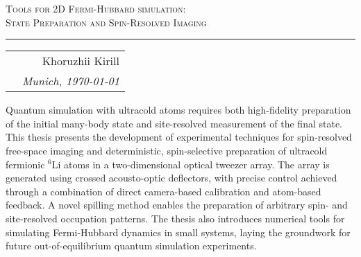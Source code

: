 

\begin{center}
    \LARGE \textsc{Tools for 2D Fermi-Hubbard simulation: \\ State Preparation and Spin-Resolved Imaging}
\end{center}

\hrule

\phantom{42}

\begin{flushright}
    \begin{tabular}{rr}
        & Khoruzhii Kirill \\
        & \textit{Munich, \today}\\
    \end{tabular}
\end{flushright}

\noindent
Quantum simulation with ultracold atoms requires both high-fidelity preparation of the initial many-body state and site-resolved measurement of the final state. This thesis presents the development of experimental techniques for spin-resolved free-space imaging and deterministic, spin-selective preparation of ultracold fermionic $^6$Li atoms in a two-dimensional optical tweezer array. The array is generated using crossed acousto-optic deflectors, with precise control achieved through a combination of direct camera-based calibration and atom-based feedback. A novel spilling method enables the preparation of arbitrary spin- and site-resolved occupation patterns. The thesis also introduces numerical tools for simulating Fermi-Hubbard dynamics in small systems, laying the groundwork for future out-of-equilibrium quantum simulation experiments.







\thispagestyle{empty}

\newpage

\thispagestyle{empty}

\tableofcontents


